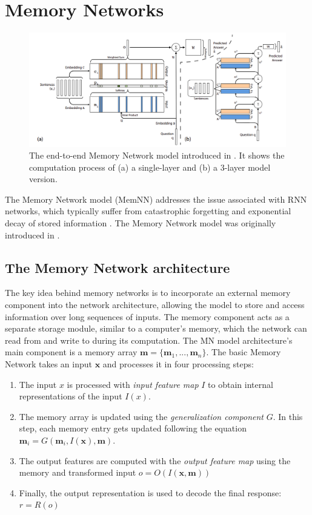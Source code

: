 \section{Memory Networks}
\label{02:sec:mem_nn}
\begin{figure}[t]
    \centering
    \includegraphics[width=\textwidth]{images/e2e_mem_nn.png}
    \caption{The end-to-end Memory Network model introduced in \citet{sukhbaatar2015end}. It shows the computation process of (a) a single-layer and (b) a 3-layer model version. }
    \label{fig:e2e_memnn}
\end{figure}
The Memory Network model (MemNN) addresses the issue associated with RNN networks, which typically suffer from catastrophic forgetting and exponential decay of stored information \cite{neil2016phased}.
The Memory Network model was originally introduced in \citet{DBLP:journals/corr/WestonCB14}.
\subsection{The Memory Network architecture}
The key idea behind memory networks is to incorporate an external memory component into the network architecture, allowing the model to store and access information over long sequences of inputs.
The memory component acts as a separate storage module, similar to a computer's memory, which the network can read from and write to during its computation.
The MN model architecture's main component is a memory array $\mathbf{m} = \{\mathbf{m}_1,...,\mathbf{m}_n\}$.
The basic Memory Network takes an input $\mathbf{x}$ and processes it in four processing steps:
\begin{enumerate}
    \item The input $x$ is processed with \emph{input feature map} $I$ to obtain internal representations of the input $I(x)$.
    \item The memory array is updated using the \emph{generalization component} $G$. In this step, each memory entry gets updated following the equation $\mathbf{m}_i = G(\mathbf{m}_i, I(\mathbf{x}), \mathbf{m})$.
    \item The output features are computed with the \emph{output feature map} using the memory and transformed input $ o = O(I(\mathbf{x}, \mathbf{m}))$
    \item Finally, the output representation is used to decode the final response: $r = R(o)$
\end{enumerate}

